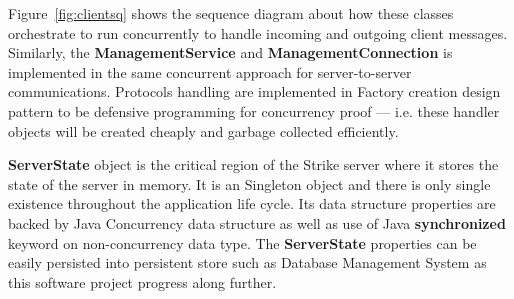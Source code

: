 \documentclass[dareport.tex]{subfiles}
\begin{document}

Figure~\ref{fig:clientsq} shows the sequence diagram about how these classes orchestrate to run concurrently to handle incoming and outgoing client messages. Similarly, the \textbf{ManagementService} and \textbf{ManagementConnection} is implemented in the same concurrent approach for server-to-server communications. Protocols handling are implemented in Factory creation design pattern to be defensive programming for concurrency proof --- i.e. these handler objects will be created cheaply and garbage collected efficiently.


\textbf{ServerState} object is the critical region of the Strike server where it stores the state of the server in memory. It is an Singleton object and there is only single existence throughout the application life cycle. Its data structure properties are backed by Java Concurrency data structure as well as use of Java \textbf{synchronized} keyword on non-concurrency data type. The \textbf{ServerState} properties can be easily persisted into persistent store such as Database Management System as this software project progress along further.
\end{document}
